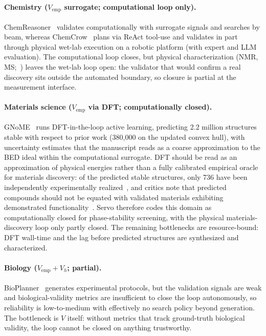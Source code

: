 \documentclass{article}
\begin{document}
\paragraph{Chemistry ($V_\text{emp}$ surrogate; computational loop only).} ChemReasoner~\citep{sprueill2024chemreasoner} validates computationally with surrogate signals and searches by beam, whereas ChemCrow~\citep{bran2023chemcrow} plans via ReAct tool-use and validates in part through physical wet-lab execution on a robotic platform (with expert and LLM evaluation). The computational loop closes, but physical characterization (NMR, MS;~\citep{kamber2026chemist}) leaves the wet-lab loop open: the validator that would confirm a real discovery sits outside the automated boundary, so closure is partial at the measurement interface.

\paragraph{Materials science ($V_\text{emp}$ via DFT; computationally closed).} GNoME~\citep{merchant2023gnome} runs DFT-in-the-loop active learning, predicting 2.2 million structures stable with respect to prior work (380{,}000 on the updated convex hull), with uncertainty estimates that the manuscript reads as a coarse approximation to the BED ideal within the computational surrogate. DFT should be read as an approximation of physical energies rather than a fully calibrated empirical oracle for materials discovery: of the predicted stable structures, only 736 have been independently experimentally realized~\citep{merchant2023gnome}, and critics note that predicted compounds should not be equated with validated materials exhibiting demonstrated functionality~\citep{cheetham2024gnome}. Servo therefore codes this domain as computationally closed for phase-stability screening, with the physical materials-discovery loop only partly closed. The remaining bottlenecks are resource-bound: DFT wall-time and the lag before predicted structures are synthesized and characterized.

\paragraph{Biology ($V_\text{emp}+V_h$; partial).} BioPlanner~\citep{odonoghue2023bioplanner} generates experimental protocols, but the validation signals are weak and biological-validity metrics are insufficient to close the loop autonomously, so reliability is low-to-medium with effectively no search policy beyond generation. The bottleneck is $V$ itself: without metrics that track ground-truth biological validity, the loop cannot be closed on anything trustworthy.
\end{document}
